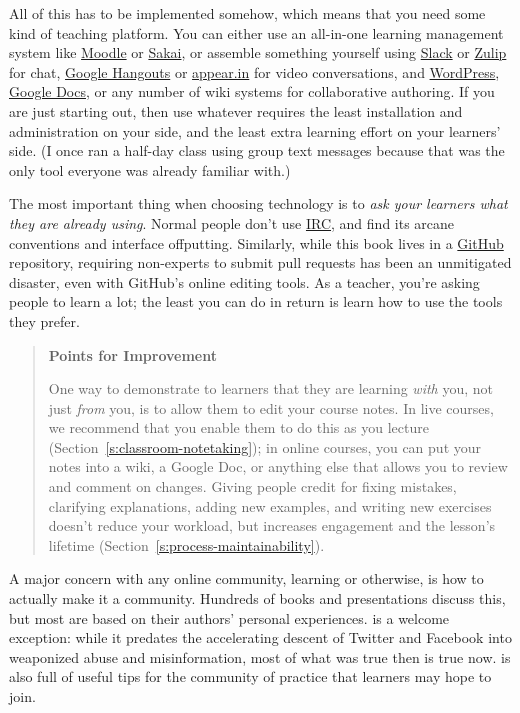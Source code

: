 All of this has to be implemented somehow, which means that you need
some kind of teaching platform. You can either use an all-in-one
learning management system like \href{http://moodle.org}{Moodle} or \href{https://www.sakaiproject.org/}{Sakai}, or
assemble something yourself using \href{http://slack.com}{Slack} or \href{https://zulipchat.com/}{Zulip} for
chat, \href{http://hangouts.google.com}{Google Hangouts} or \href{https://appear.in/}{appear.in} for
video conversations, and \href{https://wordpress.org/}{WordPress}, \href{http://docs.google.com}{Google
Docs}, or any number of wiki systems for collaborative
authoring. If you are just starting out, then use whatever requires
the least installation and administration on your side, and the least
extra learning effort on your learners' side. (I once ran a half-day
class using group text messages because that was the only tool
everyone was already familiar with.)

The most important thing when choosing technology is to \emph{ask your
learners what they are already using}. Normal people don't use
\href{https://en.wikipedia.org/wiki/Internet_Relay_Chat}{IRC}, and find its arcane conventions and interface
offputting. Similarly, while this book lives in a \href{http://github.com}{GitHub}
repository, requiring non-experts to submit pull requests has been an
unmitigated disaster, even with GitHub's online editing tools. As a
teacher, you're asking people to learn a lot; the least you can do in
return is learn how to use the tools they prefer.

\begin{quote}\setlength{\parindent}{0pt}
\textbf{Points for Improvement}

One way to demonstrate to learners that they are learning \emph{with} you,
not just \emph{from} you, is to allow them to edit your course notes. In
live courses, we recommend that you enable them to do this as you
lecture (Section~\ref{s:classroom-notetaking}); in online courses, you
can put your notes into a wiki, a Google Doc, or anything else that
allows you to review and comment on changes. Giving people credit for
fixing mistakes, clarifying explanations, adding new examples, and
writing new exercises doesn't reduce your workload, but increases
engagement and the lesson's lifetime
(Section~\ref{s:process-maintainability}).
\end{quote}

A major concern with any online community, learning or otherwise, is how
to actually make it a community. Hundreds of books and presentations
discuss this, but most are based on their authors' personal experiences.
\cite{Krau2016} is a welcome exception: while it predates the
accelerating descent of Twitter and Facebook into weaponized abuse and
misinformation, most of what was true then is true now.
\cite{Foge2005} is also full of useful tips for the community of
practice that learners may hope to join.

